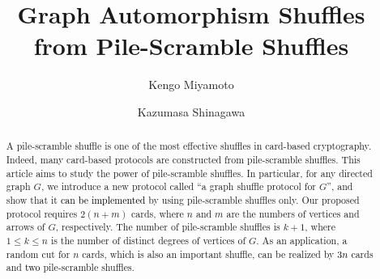 \documentclass[tikz]{amsart}
\theoremstyle{definition}
\theoremstyle{remark}
\newcommand{\md}[1]{\textcolor{black}{#1}}
\begin{document}
\title{Graph Automorphism Shuffles from Pile-Scramble Shuffles}

\author[K. Miyamoto]{Kengo Miyamoto}
\author[K. Shinagawa]{Kazumasa Shinagawa}
\address[K. Miyamoto]{Ibaraki University, 4-12-1 Nakanarusawa, Hitachi, Ibaraki, 316-8511, Japan.}
\address[K. Shinagawa]{Ibaraki University, 4-12-1 Nakanarusawa, Hitachi, Ibaraki, 316-8511, Japan; National Institute of Advanced Industrial Science and Technology (AIST), Tokyo Waterfront Bio-IT Research Building 2-4-7 Aomi, Koto-ku, Tokyo, 135-0064, Japan.}

\maketitle
\begin{abstract}
A pile-scramble shuffle is one of the most effective shuffles in card-based cryptography. 
Indeed, many card-based protocols are constructed from pile-scramble shuffles. 
This article aims to study the power of pile-scramble shuffles. 
In particular, for any directed graph $G$, we introduce a new protocol called ``a graph shuffle protocol for $G$'', and show that it \md{can be implemented} by using pile-scramble shuffles only. 
Our proposed protocol requires $2(n+m)$ cards, where $n$ and $m$ are the numbers of vertices and arrows of $G$, respectively. 
The number of pile-scramble shuffles is $k+1$, where $1 \leq k \leq n$ is the number of distinct degrees of vertices of $G$. 
As an application, a random cut for $n$ cards, which is also an important shuffle, can be realized by \md{$3n$} cards and \md{two} pile-scramble shuffles. 
\end{abstract}









\end{document}

